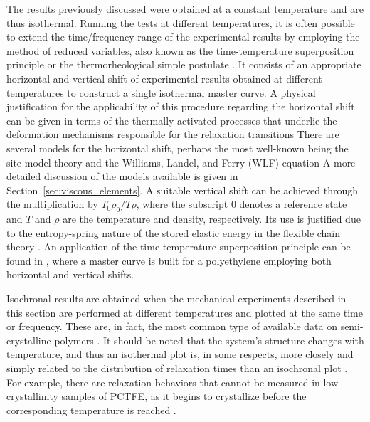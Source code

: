 The results previously discussed were obtained at a constant temperature and are thus isothermal.
Running the tests at different temperatures, it is often possible to extend the time/frequency range of the experimental results by employing the method of reduced variables, also known as the time-temperature superposition principle or the thermorheological simple postulate \citep{ferryViscoelasticPropertiesPolymers1980, christensen2013theory}.
It consists of an appropriate horizontal and vertical shift of experimental results obtained at different temperatures to construct a single isothermal master curve.
A physical justification for the applicability of this procedure regarding the horizontal shift can be given in terms of the thermally activated processes that underlie the deformation mechanisms responsible for the relaxation transitions \citep{arzhakovRelaxationPhysicalMechanical2019}
There are several models for the horizontal shift, perhaps the most well-known being the site model theory and the Williams, Landel, and Ferry (WLF) equation \citep{wardIntroductionMechanicalProperties2004, furmanskiTimeTemperatureEquivalence2013}
A more detailed discussion of the models available is given in Section~\ref{sec:viscous_elements}.
A suitable vertical shift can be achieved through the multiplication by $T_0\rho_0/T\rho$, where the subscript 0 denotes a reference state and $T$ and $\rho$ are the temperature and density, respectively.
Its use is justified due to the entropy-spring nature of the stored elastic energy in the flexible chain theory \citep{ferryViscoelasticPropertiesPolymers1980}.
An application of the time-temperature superposition principle can be found in \cite{popelarViscoelasticMaterialCharacterization1990}, where a master curve is built for a polyethylene employing both horizontal and vertical shifts.

Isochronal results are obtained when the mechanical experiments described in this section are performed at different temperatures and plotted at the same time or frequency.
These are, in fact, the most common type of available data on semi-crystalline polymers \citep{ferryViscoelasticPropertiesPolymers1980}.
It should be noted that the system's structure changes with temperature, and thus an isothermal plot is, in some respects, more closely and simply related to the distribution of relaxation times than an isochronal plot \citep{hoffmanAnalysisRelaxationsPolychlorotrifluoroethylene2007}.
For example, there are relaxation behaviors that cannot be measured in low crystallinity samples of PCTFE, as it begins to crystallize before the corresponding temperature is reached \citep{hoffmanAnalysisRelaxationsPolychlorotrifluoroethylene2007}.

